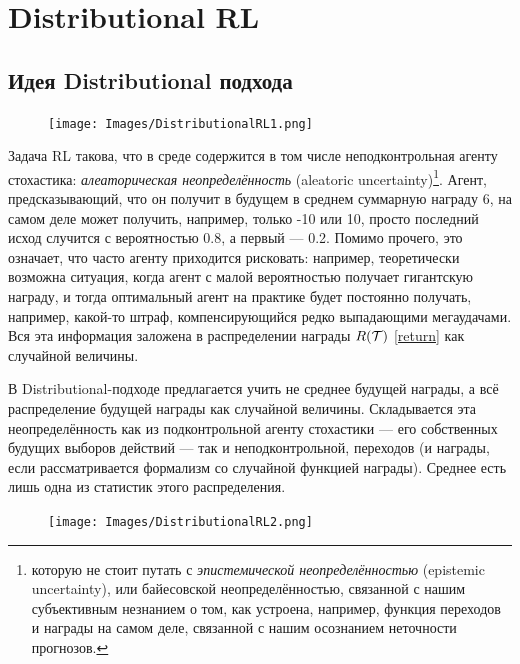 \section{Distributional RL}

\subsection{Идея Distributional подхода}

\begin{figure}
\vspace{-0.3cm}
\centering
\texttt{[image: Images/DistributionalRL1.png]}
\vspace{-0.6cm}
\end{figure}

Задача RL такова, что в среде содержится в том числе неподконтрольная агенту стохастика: \emph{алеаторическая неопределённость} (aleatoric uncertainty)\footnote{которую не стоит путать с \emph{эпистемической неопределённостью} (epistemic uncertainty), или байесовской неопределённостью, связанной с нашим субъективным незнанием о том, как устроена, например, функция переходов и награды на самом деле, связанной с нашим осознанием неточности прогнозов.}. Агент, предсказывающий, что он получит в будущем в среднем суммарную награду 6, на самом деле может получить, например, только -10 или 10, просто последний исход случится с вероятностью 0.8, а первый --- 0.2. Помимо прочего, это означает, что часто агенту приходится рисковать: например, теоретически возможна ситуация, когда агент с малой вероятностью получает гигантскую награду, и тогда оптимальный агент на практике будет постоянно получать, например, какой-то штраф, компенсирующийся редко выпадающими мегаудачами. Вся эта информация заложена в распределении награды $R(\mathcal{T})$ \eqref{return} как случайной величины.

В Distributional-подходе предлагается учить не среднее будущей награды, а всё распределение будущей награды как случайной величины. Складывается эта неопределённость как из подконтрольной агенту стохастики --- его собственных будущих выборов действий --- так и неподконтрольной, переходов (и награды, если рассматривается формализм со случайной функцией награды). Среднее есть лишь одна из статистик этого распределения. 

\begin{figure}
\vspace{-0.3cm}
\centering
\texttt{[image: Images/DistributionalRL2.png]}
\vspace{-0.3cm}
\end{figure}

